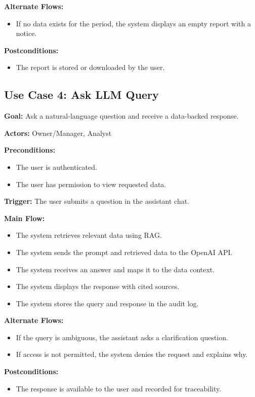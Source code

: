 \textbf{Alternate Flows:}
\begin{itemize}
    \item If no data exists for the period, the system displays an empty report with a notice.
\end{itemize}

\textbf{Postconditions:}
\begin{itemize}
    \item The report is stored or downloaded by the user.
\end{itemize}

\subsection{Use Case 4: Ask LLM Query}
\textbf{Goal:} Ask a natural-language question and receive a data-backed response.

\textbf{Actors:} Owner/Manager, Analyst

\textbf{Preconditions:}
\begin{itemize}
    \item The user is authenticated.
    \item The user has permission to view requested data.
\end{itemize}

\textbf{Trigger:} The user submits a question in the assistant chat.

\textbf{Main Flow:}
\begin{itemize}
    \item The system retrieves relevant data using RAG.
    \item The system sends the prompt and retrieved data to the OpenAI API.
    \item The system receives an answer and maps it to the data context.
    \item The system displays the response with cited sources.
    \item The system stores the query and response in the audit log.
\end{itemize}

\textbf{Alternate Flows:}
\begin{itemize}
    \item If the query is ambiguous, the assistant asks a clarification question.
    \item If access is not permitted, the system denies the request and explains why.
\end{itemize}

\textbf{Postconditions:}
\begin{itemize}
    \item The response is available to the user and recorded for traceability.
\end{itemize}

